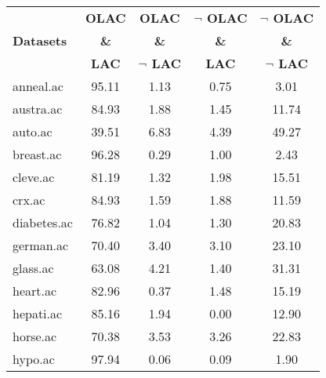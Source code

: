 \begin{table}[htbp]
	\centering
		\renewcommand{\tabcolsep}{1.8mm}
		\begin{tabular}{|l|c|c|c|c|}
		\hline
				& \textbf{OLAC}		& \textbf{OLAC}			& \textbf{$\neg$ OLAC}	& \textbf{$\neg$ OLAC}	\\
		\textbf{Datasets}	& \textbf{\&}		& \textbf{\&}			& \textbf{\&}			& \textbf{\&}			\\
				& \textbf{LAC}		& \textbf{$\neg$ LAC}		& \textbf{LAC}			& \textbf{$\neg$ LAC}		\\
		\hline
		anneal.ac       & 95.11         & 1.13               & 0.75                     & 3.01                          \\
		\hline
		austra.ac       & 84.93         & 1.88               & 1.45                     & 11.74                         \\
		\hline
		auto.ac         & 39.51         & 6.83               & 4.39                     & 49.27                         \\
		\hline
		breast.ac       & 96.28         & 0.29               & 1.00                     & 2.43                          \\
		\hline
		cleve.ac        & 81.19         & 1.32               & 1.98                     & 15.51                         \\
		\hline
		crx.ac          & 84.93         & 1.59               & 1.88                     & 11.59                         \\
		\hline
		diabetes.ac     & 76.82         & 1.04               & 1.30                     & 20.83                         \\
		\hline
		german.ac       & 70.40         & 3.40               & 3.10                     & 23.10                         \\
		\hline
		glass.ac        & 63.08         & 4.21               & 1.40                     & 31.31                         \\
		\hline
		heart.ac        & 82.96         & 0.37               & 1.48                     & 15.19                         \\
		\hline
		hepati.ac       & 85.16         & 1.94               & 0.00                     & 12.90                         \\
		\hline
		horse.ac        & 70.38         & 3.53               & 3.26                     & 22.83                         \\
		\hline
		hypo.ac         & 97.94         & 0.06               & 0.09                     & 1.90                          \\

\end{tabular}
\end{table}
